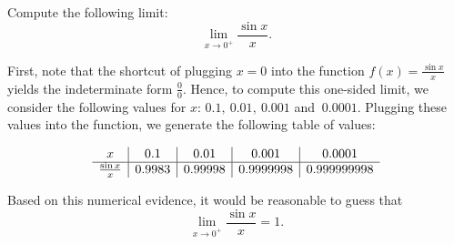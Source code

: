 \documentclass[handout]{ximera}
\begin{document}
\begin{example}[example 4]
Compute the following limit: 
\[\lim_{x \to 0^+} \frac{\sin x}{x}.\]

First, note that the shortcut of plugging $x=0$ into the 
function $\displaystyle{f(x)= \frac{\sin x}{x}}$ yields the indeterminate form $\frac{0}{0}$.
Hence, to compute this one-sided limit, we consider the following values for $x$: $0.1,\ 0.01,\ 0.001$ and $\ 0.0001$.
Plugging these values into the function, we generate the following table of values:

\[
\begin{array}{ c | c | c | c | c }
  x & 0.1 & 0.01  & 0.001 & 0.0001 \\ 
	\hline 
	 \frac{\sin x}{x} & 0.9983 & 0.99998 & 0.9999998 & 0.999999998
\end{array}
\]  

Based on this numerical evidence, 
it would be reasonable to guess that 
\[\lim_{x \to 0^{+}} \frac{\sin x}{x} = 1.\]













\end{example}

	   
\end{document}
